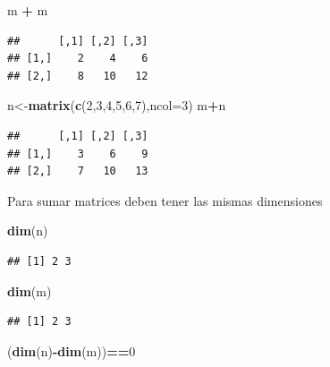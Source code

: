 \documentclass[
]{book}
\newenvironment{Shaded}{\begin{snugshade}}{\end{snugshade}}
\newcommand{\AttributeTok}[1]{\textcolor[rgb]{0.13,0.29,0.53}{#1}}
\newcommand{\DecValTok}[1]{\textcolor[rgb]{0.00,0.00,0.81}{#1}}
\newcommand{\FunctionTok}[1]{\textcolor[rgb]{0.13,0.29,0.53}{\textbf{#1}}}
\newcommand{\NormalTok}[1]{#1}
\newcommand{\OtherTok}[1]{\textcolor[rgb]{0.56,0.35,0.01}{#1}}
\newcommand{\SpecialCharTok}[1]{\textcolor[rgb]{0.81,0.36,0.00}{\textbf{#1}}}
\begin{document}
\begin{Shaded}
\begin{Highlighting}[]
\NormalTok{m }\SpecialCharTok{+}\NormalTok{ m}
\end{Highlighting}
\end{Shaded}

\begin{verbatim}
##      [,1] [,2] [,3]
## [1,]    2    4    6
## [2,]    8   10   12
\end{verbatim}

\begin{Shaded}
\begin{Highlighting}[]
\NormalTok{n}\OtherTok{\textless{}{-}}\FunctionTok{matrix}\NormalTok{(}\FunctionTok{c}\NormalTok{(}\DecValTok{2}\NormalTok{,}\DecValTok{3}\NormalTok{,}\DecValTok{4}\NormalTok{,}\DecValTok{5}\NormalTok{,}\DecValTok{6}\NormalTok{,}\DecValTok{7}\NormalTok{),}\AttributeTok{ncol=}\DecValTok{3}\NormalTok{)}
\NormalTok{m}\SpecialCharTok{+}\NormalTok{n}
\end{Highlighting}
\end{Shaded}

\begin{verbatim}
##      [,1] [,2] [,3]
## [1,]    3    6    9
## [2,]    7   10   13
\end{verbatim}

Para sumar matrices deben tener las mismas dimensiones

\begin{Shaded}
\begin{Highlighting}[]
\FunctionTok{dim}\NormalTok{(n)}
\end{Highlighting}
\end{Shaded}

\begin{verbatim}
## [1] 2 3
\end{verbatim}

\begin{Shaded}
\begin{Highlighting}[]
\FunctionTok{dim}\NormalTok{(m)}
\end{Highlighting}
\end{Shaded}

\begin{verbatim}
## [1] 2 3
\end{verbatim}

\begin{Shaded}
\begin{Highlighting}[]
\NormalTok{(}\FunctionTok{dim}\NormalTok{(n)}\SpecialCharTok{{-}}\FunctionTok{dim}\NormalTok{(m))}\SpecialCharTok{==}\DecValTok{0}
\end{Highlighting}
\end{Shaded}
\end{document}

